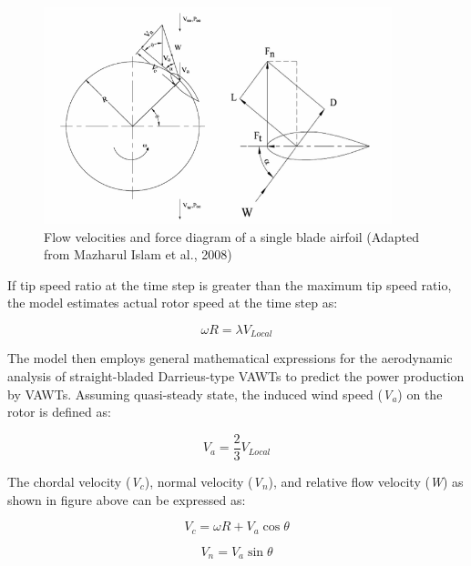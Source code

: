 \begin{figure}[hbtp] %
\centering
\includegraphics[width=0.9\textwidth, height=0.9\textheight, keepaspectratio=true]{media/image7837.png}
\caption{Flow velocities and force diagram of a single blade airfoil (Adapted from Mazharul Islam et al., 2008) \protect \label{fig:flow-velocities-and-force-diagram-of-a-single}}
\end{figure}

If tip speed ratio at the time step is greater than the maximum tip speed ratio, the model estimates actual rotor speed at the time step as:

\begin{equation}
\omega R = \lambda {V_{Local}}
\end{equation}

The model then employs general mathematical expressions for the aerodynamic analysis of straight-bladed Darrieus-type VAWTs to predict the power production by VAWTs. Assuming quasi-steady state, the induced wind speed (\emph{V\(_{a}\)}) on the rotor is defined as:

\begin{equation}
{V_a} = \frac{2}{3}{V_{Local}}
\end{equation}

The chordal velocity (\emph{V\(_{c}\)}), normal velocity (\emph{V\(_{n}\)}), and relative flow velocity (\emph{W}) as shown in figure above can be expressed as:

\begin{equation}
{V_c} = \omega R + {V_a}\cos \theta
\end{equation}

\begin{equation}
{V_n} = {V_a}\sin \theta
\end{equation}

